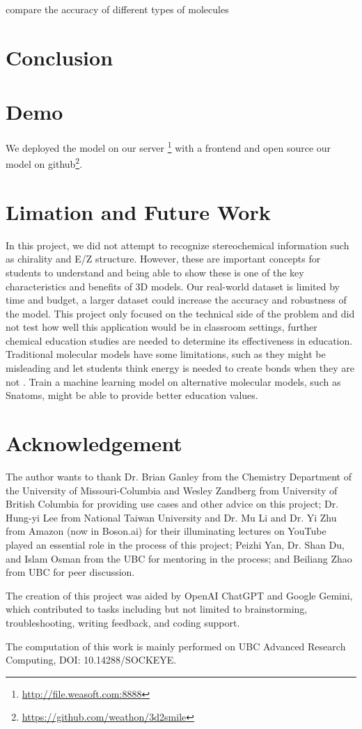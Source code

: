 \documentclass{article}
\begin{document}
compare the accuracy of different types of molecules
\section{Conclusion}
\section{Demo}
We deployed the model on our server \footnote{\url{http://file.weasoft.com:8888}} with a frontend and open source our model on github\footnote{\url{https://github.com/weathon/3d2smile}}. 
\section{Limation and Future Work}
In this project, we did not attempt to recognize stereochemical information such as chirality and E/Z structure. However, these are important concepts for students to understand and being able to show these is one of the key characteristics and benefits of 3D models. 
Our real-world dataset is limited by time and budget, a larger dataset could increase the accuracy and robustness of the model. 
This project only focused on the technical side of the problem and did not test how well this application would be in classroom settings, further chemical education studies are needed to determine its effectiveness in education. 
Traditional molecular models have some limitations, such as they might be misleading and let students think energy is needed to create bonds when they are not \autocite{snatoms}. Train a machine learning model on alternative molecular models, such as Snatoms\autocite{snatoms}, might be able to provide better education values.
\section*{Acknowledgement}
The author wants to thank Dr. Brian Ganley from the Chemistry Department of the University of Missouri-Columbia and Wesley Zandberg from University of British Columbia for providing use cases and other advice on this project; Dr. Hung-yi Lee from National Taiwan University and Dr. Mu Li and Dr. Yi Zhu from Amazon (now in Boson.ai) for their illuminating lectures on YouTube played an essential role in the process of this project; Peizhi Yan, Dr. Shan Du, and Islam Osman from the UBC for mentoring in the process; and Beiliang Zhao from UBC for peer discussion.


The creation of this project was aided by OpenAI ChatGPT and Google Gemini, which contributed to tasks including but not limited to brainstorming, troubleshooting, writing feedback, and coding support.

The computation of this work is mainly performed on UBC Advanced Research Computing, DOI: 10.14288/SOCKEYE.

\printbibliography
\end{document}
